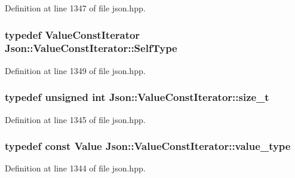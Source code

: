 Definition at line 1347 of file json.\-hpp.

\hypertarget{class_json_1_1_value_const_iterator_a0c2e33e7eb5a80dd8709fb28ece83933}{
\subsubsection[{Self\-Type}]{\setlength{\rightskip}{0pt plus 5cm}typedef {\bf Value\-Const\-Iterator} {\bf Json\-::\-Value\-Const\-Iterator\-::\-Self\-Type}}}\label{class_json_1_1_value_const_iterator_a0c2e33e7eb5a80dd8709fb28ece83933}


Definition at line 1349 of file json.\-hpp.

\hypertarget{class_json_1_1_value_const_iterator_a8685219d214dbd2b763357ae94fb0f27}{
\subsubsection[{size\-\_\-t}]{\setlength{\rightskip}{0pt plus 5cm}typedef unsigned int {\bf Json\-::\-Value\-Const\-Iterator\-::size\-\_\-t}}}\label{class_json_1_1_value_const_iterator_a8685219d214dbd2b763357ae94fb0f27}


Definition at line 1345 of file json.\-hpp.

\hypertarget{class_json_1_1_value_const_iterator_aa5f1707dcef4bfe73e23ddc14dbe760d}{
\subsubsection[{value\-\_\-type}]{\setlength{\rightskip}{0pt plus 5cm}typedef const {\bf Value} {\bf Json\-::\-Value\-Const\-Iterator\-::value\-\_\-type}}}\label{class_json_1_1_value_const_iterator_aa5f1707dcef4bfe73e23ddc14dbe760d}


Definition at line 1344 of file json.\-hpp.



